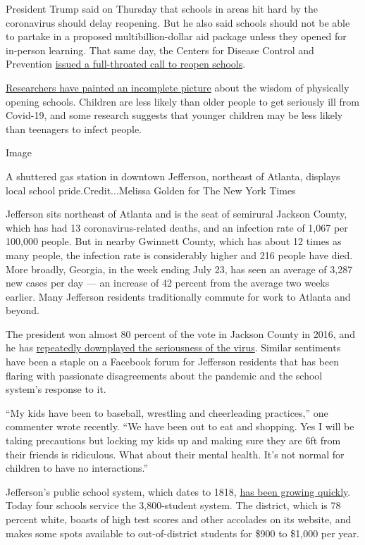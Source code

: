 President Trump said on Thursday that schools in areas hit hard by the
coronavirus should delay reopening. But he also said schools should not
be able to partake in a proposed multibillion-dollar aid package unless
they opened for in-person learning. That same day, the Centers for
Disease Control and Prevention
\href{https://www.nytimes.com/2020/07/24/health/cdc-schools-coronavirus.html}{issued
a full-throated call to reopen schools}.

\href{https://www.nytimes.com/2020/07/11/health/coronavirus-schools-reopen.html}{Researchers
have painted an incomplete picture} about the wisdom of physically
opening schools. Children are less likely than older people to get
seriously ill from Covid-19, and some research suggests that younger
children may be less likely than teenagers to infect people.

Image

A shuttered gas station in downtown Jefferson, northeast of Atlanta,
displays local school pride.Credit...Melissa Golden for The New York
Times

Jefferson sits northeast of Atlanta and is the seat of semirural Jackson
County, which has had 13 coronavirus-related deaths, and an infection
rate of 1,067 per 100,000 people. But in nearby Gwinnett County, which
has about 12 times as many people, the infection rate is considerably
higher and 216 people have died. More broadly, Georgia, in the week
ending July 23, has seen an average of 3,287 new cases per day --- an
increase of 42 percent from the average two weeks earlier. Many
Jefferson residents traditionally commute for work to Atlanta and
beyond.

The president won almost 80 percent of the vote in Jackson County in
2016, and he has
\href{https://www.nytimes.com/2020/03/27/us/politics/trump-coronavirus-factcheck.html}{repeatedly
downplayed the seriousness of the virus}. Similar sentiments have been a
staple on a Facebook forum for Jefferson residents that has been flaring
with passionate disagreements about the pandemic and the school system's
response to it.

``My kids have been to baseball, wrestling and cheerleading practices,''
one commenter wrote recently. ``We have been out to eat and shopping.
Yes I will be taking precautions but locking my kids up and making sure
they are 6ft from their friends is ridiculous. What about their mental
health. It's not normal for children to have no interactions.''

Jefferson's public school system, which dates to 1818,
\href{https://www.wsbtv.com/news/local/local-school-district-s-student-population-explodes-in-recent-years/799563106/}{has
been growing quickly}. Today four schools service the 3,800-student
system. The district, which is 78 percent white, boasts of high test
scores and other accolades on its website, and makes some spots
available to out-of-district students for \$900 to \$1,000 per year.

